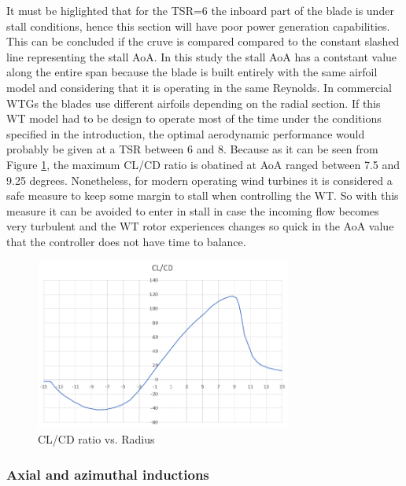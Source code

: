 It must be higlighted that for the TSR=6 the inboard part of the blade is under stall conditions, hence this section will have poor power generation capabilities. This can be concluded if the cruve is compared compared to the constant slashed line representing the stall AoA. In this study the stall AoA has a contstant value along the entire span because the blade is built entirely with the same airfoil model and considering that it is operating in the same Reynolds. In commercial WTGs the blades use different airfoils depending on the radial section. If this WT model had to be design to operate most of the time under the conditions specified in the introduction, the optimal aerodynamic performance would probably be given at a TSR between 6 and 8. Because as it can be seen from Figure \ref{CL_CD_alligned}, the maximum CL/CD ratio is obatined at AoA ranged between 7.5 and 9.25 degrees. Nonetheless, for modern operating wind turbines it is considered a safe measure to keep some margin to stall when controlling the WT. So with this measure it can be avoided to enter in stall in case the incoming flow becomes very turbulent and the WT rotor experiences changes so quick in the AoA value that the controller does not have time to balance.

\begin{figure}[htbp]
\includegraphics[width=0.75\textwidth]{./img/CL_CD_plt.png}
\caption{CL/CD ratio vs. Radius }
\centering
\label{CL_CD_alligned}
\end{figure}


\subsubsection{\textbf{Axial and azimuthal inductions}  }

